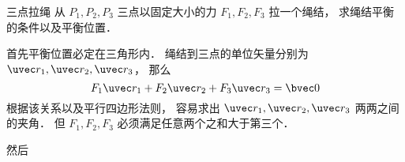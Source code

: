 
\begin{issues}
\issueDraft
\end{issues}

\begin{example}{三点拉绳}
从 $P_1,P_2,P_3$ 三点以固定大小的力 $F_1, F_2, F_3$ 拉一个绳结， 求绳结平衡的条件以及平衡位置．

首先平衡位置必定在三角形内． 绳结到三点的单位矢量分别为 $\uvec r_1, \uvec r_2, \uvec r_3$， 那么
\begin{equation}
F_1 \uvec r_1 + F_2 \uvec r_2 + F_3 \uvec r_3 = \bvec 0
\end{equation}
根据该关系以及平行四边形法则， 容易求出 $\uvec r_1, \uvec r_2, \uvec r_3$ 两两之间的夹角． 但 $F_1, F_2, F_3$ 必须满足任意两个之和大于第三个．

然后
\end{example}
